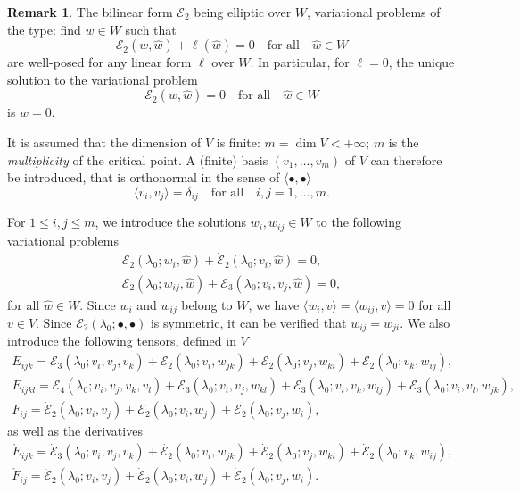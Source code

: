 \documentclass[12pt, final]{scrartcl}
\theoremstyle{definition}
\newtheorem{remark}{Remark}
\newcommand{\E}{\mathcal E}
\begin{document}
\begin{remark}
  \label{rem:20220902095055}
  The bilinear form $\E_2$ being elliptic over $W$, variational problems of the type: find $w \in W$ such that
  \begin{equation}
    \E_2(w, \hat{w})+\ell(\hat{w}) = 0 \quad \text{for all} \quad \hat{w} \in W
  \end{equation}
  are well-posed for any linear form $\ell$ over $W$. In particular, for $\ell=0$, the unique solution to the
  variational problem
  \begin{equation}
    \E_2(w, \hat{w}) = 0 \quad \text{for all} \quad \hat{w} \in W
  \end{equation}
  is $w = 0$.
\end{remark}

It is assumed that the dimension of $V$ is finite: $m = \dim V < +\infty$; $m$ is the \emph{multiplicity} of the
critical point. A (finite) basis $(v_1, \ldots, v_m)$ of $V$ can therefore be introduced, that is orthonormal in the
sense of $\langle \bullet, \bullet \rangle$
\begin{equation}
  \langle v_i, v_j \rangle = \delta_{ij} \quad \text{for all} \quad i, j = 1, \ldots, m.
\end{equation}

For $1 \leq i, j \leq m$, we introduce the solutions $w_i, w_{ij} \in W$ to the following variational problems
\begin{gather}
  \label{eq:20220524134525}
  \E_2(\lambda_0; w_i, \hat{w}) + \dot{\E}_2(\lambda_0; v_i, \hat{w}) = 0,\\
  \label{eq:20220519164523}
  \E_2(\lambda_0; w_{i j}, \hat{w})+\E_3(\lambda_0; v_i, v_j, \hat{w}) = 0,
\end{gather}
for all $\hat{w} \in W$. Since $w_{i}$ and $w_{ij}$ belong to $W$, we have
$\langle w_{i}, v \rangle = \langle w_{ij}, v \rangle = 0$ for all $v \in V$. Since $\E_2(\lambda_0; \bullet, \bullet)$
is symmetric, it can be verified that $w_{ij}=w_{ji}$. We also introduce the following tensors, defined in $V$
\begin{gather}
  E_{ijk} = \E_3(\lambda_0; v_i, v_j, v_k) + \E_2(\lambda_0; v_i, w_{jk}) + \E_2(\lambda_0; v_j, w_{ki}) + \E_2(\lambda_0; v_k, w_{ij}),\\
  \label{eq:20221116155507}
  E_{ijkl} = \E_4(\lambda_0 ; v_i, v_j, v_k, v_l) + \E_3(\lambda_0 ; v_i, v_j, w_{kl}) + \E_3(\lambda_0 ; v_i, v_k, w_{lj}) + \E_3(\lambda_0 ; v_i, v_l, w_{jk}),\\
  F_{ij} = \dot{\E}_2(\lambda_0; v_i, v_j) + \E_2(\lambda_0; v_i, w_j) + \E_2(\lambda_0; v_j, w_i),
\end{gather}
as well as the derivatives
\begin{gather}
  \label{eq:20220615063626}
  \mathring{E}_{ijk} = \dot{\E}_3(\lambda_0; v_i, v_j, v_k) + \dot{\E_2}(\lambda_0; v_i, w_{jk}) + \dot{\E}_2(\lambda_0; v_j, w_{ki}) + \dot{\E}_2(\lambda_0; v_k, w_{ij}),\\
  \label{eq:20220615063633}
  \mathring{F}_{ij} = \ddot{\E}_2(\lambda_0; v_i, v_j) + \dot{\E}_2(\lambda_0; v_i, w_j) + \dot{\E}_2(\lambda_0; v_j, w_i).
\end{gather}
\end{document}

